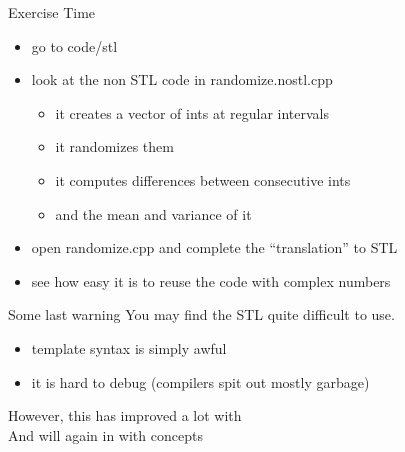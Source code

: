 \begin{frame}[fragile]
  \begin{alertblock}{Exercise Time}
    \begin{itemize}
    \item go to code/stl
    \item look at the non STL code in randomize.nostl.cpp
      \begin{itemize}
        \item it creates a vector of ints at regular intervals
        \item it randomizes them
        \item it computes differences between consecutive ints
        \item and the mean and variance of it
      \end{itemize}
    \item open randomize.cpp and complete the ``translation'' to STL
    \item see how easy it is to reuse the code with complex numbers
    \end{itemize}
  \end{alertblock}
\end{frame}

\begin{frame}[fragile]
  \begin{alertblock}{Some last warning}
    You may find the STL quite difficult to use.
    \begin{itemize}
    \item template syntax is simply awful
    \item it is hard to debug (compilers spit out mostly garbage)
    \end{itemize}
    However, this has improved a lot with  \\
    And will again in  with concepts
  \end{alertblock}
\end{frame}

